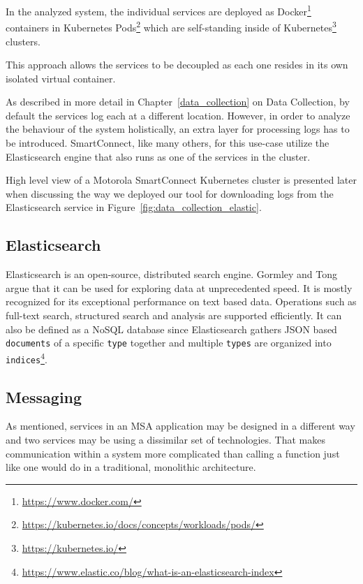 In the analyzed system, the individual services are deployed as Docker\footnote{\url{https://www.docker.com/}} containers in Kubernetes Pods\footnote{\url{https://kubernetes.io/docs/concepts/workloads/pods/}} which are self-standing inside of Kubernetes\footnote{\url{https://kubernetes.io/}} clusters.

This approach allows the services to be decoupled as each one resides in its own isolated virtual container.

As described in more detail in Chapter~\ref{data_collection} on Data Collection, by default the services log each at a different location. 
However, in order to analyze the behaviour of the system holistically, an extra layer for processing logs has to be introduced. SmartConnect, like many others, for this use-case utilize the Elasticsearch engine that also runs as one of the services in the cluster.

High level view of a Motorola SmartConnect Kubernetes cluster is presented later when discussing the way we deployed our tool for downloading logs from the Elasticsearch service in Figure~\ref{fig:data_collection_elastic}.


\subsection{Elasticsearch}
\label{smart-connect:elastic-search}
Elasticsearch is an open-source, distributed search engine. Gormley and Tong \cite{gormley2015elasticsearch} argue that it can be used for exploring data at unprecedented speed. It is mostly recognized for its exceptional performance on text based data. Operations such as full-text search, structured search and analysis are supported efficiently.
It can also be defined as a NoSQL database since Elasticsearch gathers JSON based \texttt{documents} of a specific \texttt{type} together and multiple \texttt{types} are organized into \texttt{indices}\footnote{\url{https://www.elastic.co/blog/what-is-an-elasticsearch-index}}. 

\subsection{Messaging}
\label{architecture:messaging}
As mentioned, services in an MSA application may be designed in a different way and two services may be using a dissimilar set of technologies. That makes communication within a system more complicated than calling a function just like one would do in a traditional, monolithic architecture.

